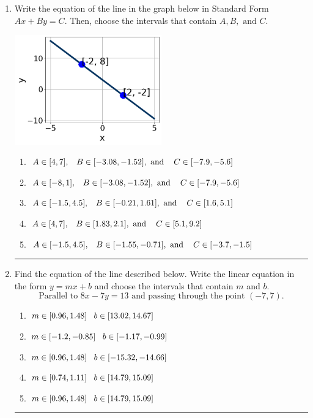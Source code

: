 \documentclass[14pt]{extbook}
\newcommand{\litem}[1]{\item#1\hspace*{-1cm}\rule{\textwidth}{0.4pt}}
\begin{document}
\begin{enumerate}
{\begin{enumerate}[label=\Alph*.]
\end{enumerate} }
\litem{
Write the equation of the line in the graph below in Standard Form $Ax+By=C$. Then, choose the intervals that contain $A, B, \text{ and } C$.
\begin{center}
    \includegraphics[width=0.5\textwidth]{../Figures/linearGraphToStandardB.png}
\end{center}
\begin{enumerate}[label=\Alph*.]
\item \( A \in [4, 7], \hspace{3mm} B \in [-3.08, -1.52], \text{ and } \hspace{3mm} C \in [-7.9, -5.6] \)
\item \( A \in [-8, 1], \hspace{3mm} B \in [-3.08, -1.52], \text{ and } \hspace{3mm} C \in [-7.9, -5.6] \)
\item \( A \in [-1.5, 4.5], \hspace{3mm} B \in [-0.21, 1.61], \text{ and } \hspace{3mm} C \in [1.6, 5.1] \)
\item \( A \in [4, 7], \hspace{3mm} B \in [1.83, 2.1], \text{ and } \hspace{3mm} C \in [5.1, 9.2] \)
\item \( A \in [-1.5, 4.5], \hspace{3mm} B \in [-1.55, -0.71], \text{ and } \hspace{3mm} C \in [-3.7, -1.5] \)

\end{enumerate} }
\litem{
Find the equation of the line described below. Write the linear equation in the form $ y=mx+b $ and choose the intervals that contain $m$ and $b$.\[ \text{Parallel to } 8 x - 7 y = 13 \text{ and passing through the point } (-7, 7). \]\begin{enumerate}[label=\Alph*.]
\item \( m \in [0.96, 1.48] \hspace*{3mm} b \in [13.02, 14.67] \)
\item \( m \in [-1.2, -0.85] \hspace*{3mm} b \in [-1.17, -0.99] \)
\item \( m \in [0.96, 1.48] \hspace*{3mm} b \in [-15.32, -14.66] \)
\item \( m \in [0.74, 1.11] \hspace*{3mm} b \in [14.79, 15.09] \)
\item \( m \in [0.96, 1.48] \hspace*{3mm} b \in [14.79, 15.09] \)


\end{enumerate}}
\end{enumerate}
\end{document}
